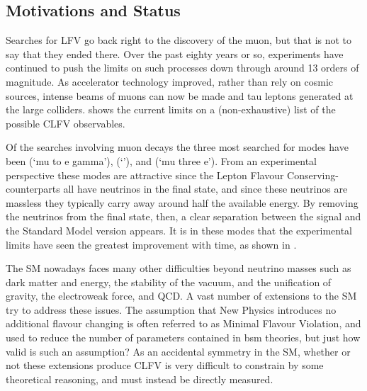 \subsection{Motivations and Status}
Searches for \ac{LFV} go back right to the discovery of the muon, but that is not to say that they ended there.
Over the past eighty years or so, experiments have continued to push the limits on such processes down through around 13 orders of magnitude.
As accelerator technology improved, rather than rely on cosmic sources, intense beams of muons can now be made and tau leptons generated at the large colliders.
 shows the current limits on a (non-exhaustive) list of the possible \ac{CLFV} observables.

Of the searches involving muon decays the three most searched for modes have been \mueg (`mu to e gamma'), \muec (`\mueconv'), and \muThreeE (`mu three e').
From an experimental perspective these modes are attractive since the Lepton Flavour Conserving-counterparts all have neutrinos in the final state, and since these neutrinos are massless they typically carry away around half the available energy.
By removing the neutrinos from the final state, then, a clear separation between the signal and the Standard Model version appears.
It is in these modes that the experimental limits have seen the greatest improvement with time, as shown in .

The \ac{SM} nowadays faces many other difficulties beyond neutrino masses such as dark matter and energy, the stability of the vacuum, and the unification of gravity, the electroweak force, and \ac{QCD}.
A vast number of extensions to the \ac{SM} try to address these issues.
The assumption that New Physics introduces no additional flavour changing is often referred to as Minimal Flavour Violation, and used to reduce the number of parameters contained in \ac{bsm} theories, but just how valid is such an assumption?
As an accidental symmetry in the \ac{SM}, whether or not these extensions produce \ac{CLFV} is very difficult to constrain by some theoretical reasoning, and must instead be directly measured.

